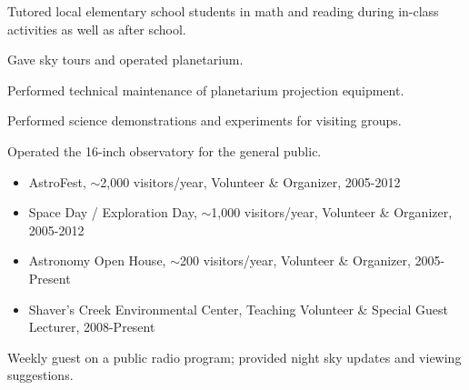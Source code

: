\begin{small}
{Tutored local elementary school students in math and reading during in-class activities as well as after school.}





{Gave sky tours and operated planetarium.}

{Performed technical maintenance of planetarium projection equipment.}

{Performed science demonstrations and experiments for visiting groups.}

{Operated the 16-inch observatory for the general public.}



{\begin{itemize}
 \item AstroFest, $\sim$2,000 visitors/year, Volunteer \& Organizer, 2005-2012
 \item Space Day / Exploration Day, $\sim$1,000 visitors/year, Volunteer \& Organizer, 2005-2012
 \item Astronomy Open House, $\sim$200 visitors/year, Volunteer \& Organizer, 2005-Present
 \item Shaver's Creek Environmental Center, Teaching Volunteer \& Special Guest Lecturer, 2008-Present
 \end{itemize}
}

{Weekly guest on a public radio program; provided night sky updates and viewing suggestions.}

\end{small}
